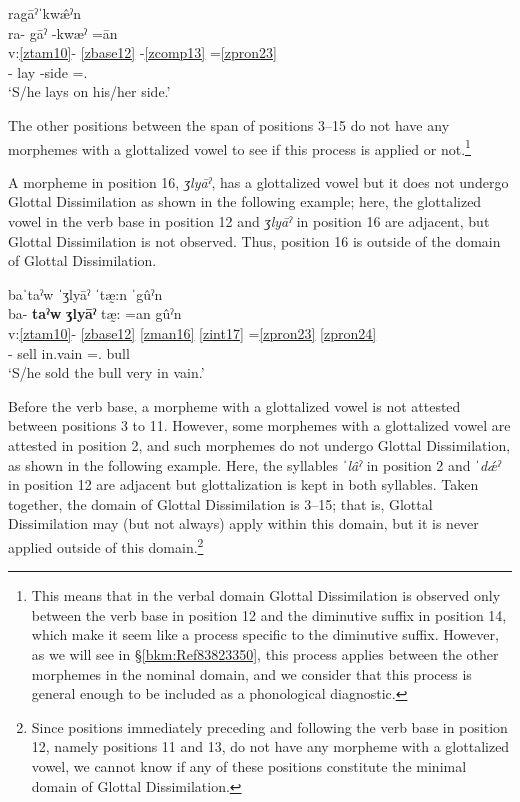 \documentclass[output=paper]{langscibook}
\begin{document}
\ea\label{ex:key:zap:49}
{ragāˀˈkw\^{æ}ˀn}\\
\glll ra- gāˀ -kwæˀ =ān \\
v:\ref{ztam10}- \ref{zbase12} {}-\ref{zcomp13} =\ref{zpron23} \\ 
\Hab{}- lay -side =\Third\Sg{}.\Inf{}\\
\glt `S/he lays on his/her side.'
\z

The other positions between the span of positions 3–15 do not have any morphemes with a glottalized vowel to see if this process is applied or not.\footnote{This means that in the verbal domain Glottal Dissimilation is observed only between the verb base in position 12 and the diminutive suffix in position 14, which make it seem like a process specific to the diminutive suffix. However, as we will see in §\ref{bkm:Ref83823350}, this process applies between the other morphemes in the nominal domain, and we consider that this process is general enough to be included as a phonological diagnostic.} 

A morpheme in position 16, \textit{ʒlyāˀ}, has a glottalized vowel but it does not undergo Glottal Dissimilation as shown in the following example; here, the glottalized vowel in the verb base in position 12 and \textit{ʒlyāˀ} in position 16 are adjacent, but Glottal Dissimilation is not observed. Thus, position 16 is outside of the domain of Glottal Dissimilation. 

\ea\label{ex:key:zap:50}
{baˈtaˀw ˈʒlyāˀ ˈtæ̰:n ˈgûˀn}\\
\glll ba- \textbf{taˀw} \textbf{ʒlyāˀ} tæ̰: =an gûˀn\\
v:\ref{ztam10}- \ref{zbase12} \ref{zman16} \ref{zint17} =\ref{zpron23} \ref{zpron24} \\
\Compl{}- sell in.vain \Intens{} =\Third\Sg{}.\Inf{} bull\\
\glt `S/he sold the bull very in vain.'
\z

Before the verb base, a morpheme with a glottalized vowel is not attested between positions 3 to 11. However, some morphemes with a glottalized vowel are attested in position 2, and such morphemes do not undergo Glottal Dissimilation, as shown in the following example. Here, the syllables \textit{ˈlâˀ} in position 2 and \textit{ˈdǽˀ} in position 12 are adjacent but glottalization is kept in both syllables. Taken together, the domain of Glottal Dissimilation is 3--15; that is, Glottal Dissimilation may (but not always) apply within this domain, but it is never applied outside of this domain.\footnote{Since positions immediately preceding and following the verb base in position 12, namely positions 11 and 13, do not have any morpheme with a glottalized vowel, we cannot know if any of these positions constitute the minimal domain of Glottal Dissimilation.} 
\end{document}
